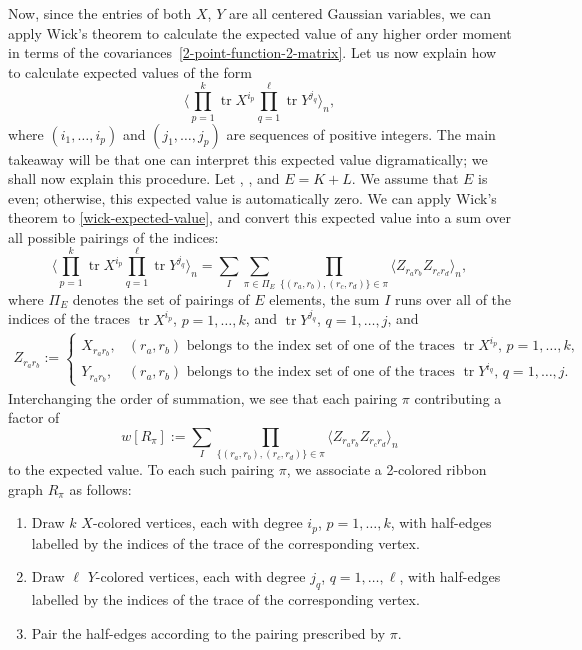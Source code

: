 \documentclass[pdftex]{sigma}
\DeclareMathOperator{\tr}{tr}
\numberwithin{equation}{section}
\begin{document}
Now, since the entries of both $X$, $Y$ are all centered Gaussian variables, we can apply Wick's theorem to calculate the expected value of any higher order moment in terms of the covariances~\eqref{2-point-function-2-matrix}. Let us now explain how to calculate expected values of the form
 \begin{equation}\label{wick-expected-value}
 \Biggl\langle \prod_{p=1}^k \tr X^{i_p} \prod_{q=1}^\ell \tr Y^{j_q}\Biggr\rangle_n,
 \end{equation}
where $(i_1,\dots,i_p)$ and $(j_1,\dots,j_p)$ are sequences of positive integers. The main takeaway will be that one can interpret this expected value digramatically; we shall now explain this procedure. Let , , and $E = K+L$. We assume that $E$ is even; otherwise, this expected value is automatically zero. We can apply Wick's theorem to \eqref{wick-expected-value}, and convert this expected value into a sum over all possible pairings of the indices:
 \begin{equation*}
 \Biggl\langle \prod_{p=1}^k \tr X^{i_p} \prod_{q=1}^\ell \tr Y^{j_q}\Biggr\rangle_n = \sum_{I} \sum_{\pi \in \Pi_{E}}\prod_{\{(r_a,r_b),(r_c,r_d)\} \in \pi} \langle Z_{r_a r_b} Z_{r_c r_d}\rangle_n,
 \end{equation*}
where $\Pi_{E}$ denotes the set of pairings of $E$ elements, the sum $I$ runs over all of the indices of the traces $\tr X^{i_p}$, $p = 1,\dots,k$, and $\tr Y^{j_q}$, $q = 1,\dots,j$, and
 \begin{gather*}
 Z_{r_a r_b} \!:=\!
 \begin{cases}
 X_{r_a r_b}, & (r_a,r_b) \text{ belongs to the index set of one of the traces $\tr X^{i_p}$, $p\! =\! 1,\dots,k$},\\
 Y_{r_a r_b}, & (r_a,r_b) \text{ belongs to the index set of one of the traces $\tr Y^{i_q}$, $q\! =\! 1,\dots,j$}.
 \end{cases}
 \end{gather*}
Interchanging the order of summation, we see that each pairing $\pi$ contributing a factor of
 \begin{equation*}
 w[R_{\pi}] := \sum_{I}\prod_{\{(r_a,r_b),(r_c,r_d)\} \in \pi} \langle Z_{r_a r_b} Z_{r_c r_d}\rangle_n
 \end{equation*}
to the expected value. To each such pairing $\pi$, we associate a 2-colored ribbon graph $R_\pi$ as follows:
 \begin{enumerate}\itemsep=0pt
 \item[$(1)$] Draw $k$ $X$-colored vertices, each with degree $i_p$, $p=1,\dots,k$, with half-edges labelled by the indices of the trace of the corresponding vertex.
 \item[$(2)$] Draw $\ell$ $Y$-colored vertices, each with degree $j_q$, $q=1,\dots,\ell$, with half-edges labelled by the indices of the trace of the corresponding vertex.
 \item[$(3)$] Pair the half-edges according to the pairing prescribed by $\pi$.
 \end{enumerate}
\end{document}
